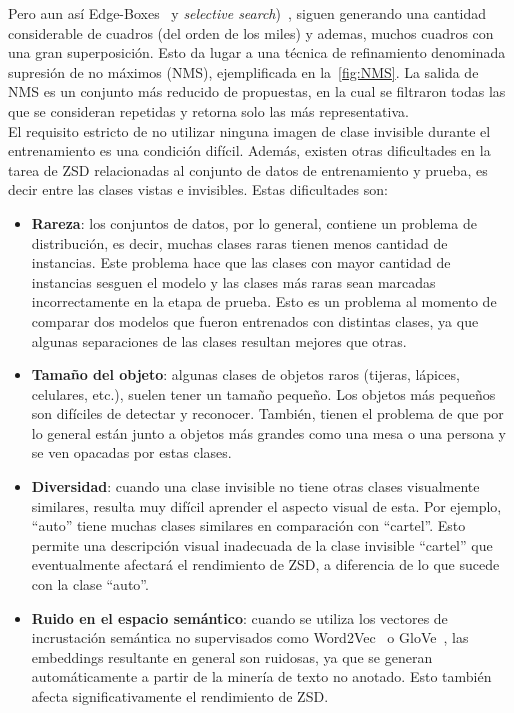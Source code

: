 Pero aun así Edge-Boxes~\cite{zitnick2014edge} y \textit{selective search})~\cite{uijlings2013selective}, siguen generando una cantidad considerable de cuadros (del orden de los miles) y ademas, muchos cuadros con una gran superposición. Esto da lugar a una técnica de refinamiento denominada supresión de no máximos (NMS), ejemplificada en la~\autoref{fig:NMS}. La salida de NMS es un conjunto más reducido de propuestas, en la cual se filtraron todas las que se consideran repetidas y retorna solo las más representativa.\\

El requisito estricto de no utilizar ninguna imagen de clase invisible durante el entrenamiento es una condición difícil. Además, existen otras dificultades en la tarea de ZSD relacionadas al conjunto de datos de entrenamiento y prueba, es decir entre las clases vistas e invisibles. Estas dificultades son:

\begin{itemize}
	\item \textbf{Rareza}: los conjuntos de datos, por lo general, contiene un problema de distribución, es decir, muchas clases raras tienen menos cantidad de instancias. Este problema hace que las clases con mayor cantidad de instancias sesguen el modelo y las clases más raras sean marcadas incorrectamente en la etapa de prueba. Esto es un problema al momento de comparar dos modelos que fueron entrenados con distintas clases, ya que algunas separaciones  de las clases resultan mejores que otras.
	
	\item \textbf{Tamaño del objeto}: algunas clases de objetos raros (tijeras, lápices, celulares, etc.), suelen tener un tamaño pequeño. Los objetos más pequeños son difíciles de detectar y reconocer. También, tienen el problema de que por lo general están junto a objetos más grandes como una mesa o una persona y se ven opacadas por estas clases.
	
	\item \textbf{Diversidad}: cuando una clase invisible no tiene otras clases visualmente similares, resulta muy difícil aprender el aspecto visual de esta. Por ejemplo, ``auto'' tiene muchas clases similares en comparación con ``cartel''. Esto permite una descripción visual inadecuada de la clase invisible ``cartel'' que eventualmente afectará el rendimiento de ZSD, a diferencia de lo que sucede con la clase ``auto''.
	
	\item \textbf{Ruido en el espacio semántico}: cuando se utiliza los vectores de incrustación semántica no supervisados como Word2Vec~\cite{mikolov2013distributed} o GloVe~\cite{pennington2014glove}, las embeddings resultante en general son ruidosas, ya que se generan automáticamente a partir de la minería de texto no anotado. Esto también afecta significativamente el rendimiento de ZSD.
\end{itemize}


